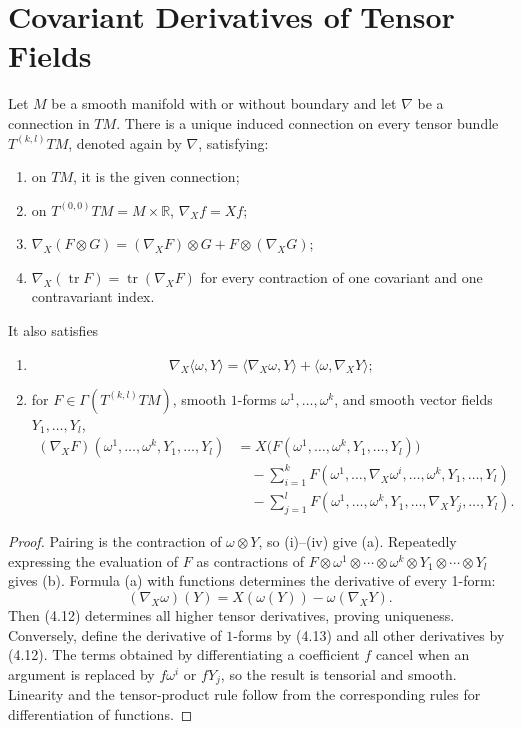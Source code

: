 \section{Covariant Derivatives of Tensor Fields}

\begin{proposition}
\label{prop:connection-on-tensor-bundles}


Let $M$ be a smooth manifold with or without boundary and let $\nabla$ be a
connection in $TM$. There is a unique induced connection on every tensor
bundle $T^{(k,l)}TM$, denoted again by $\nabla$, satisfying:
\begin{enumerate}
\item[(i)] on $TM$, it is the given connection;
\item[(ii)] on $T^{(0,0)}TM=M\times\mathbb R$, $\nabla_Xf=Xf$;
\item[(iii)] $\nabla_X(F\otimes G)=(\nabla_XF)\otimes G+F\otimes(\nabla_XG)$;
\item[(iv)] $\nabla_X(\operatorname{tr}F)=\operatorname{tr}(\nabla_XF)$ for every
contraction of one covariant and one contravariant index.
\end{enumerate}
It also satisfies
\begin{enumerate}
\item[(a)]
\[
\nabla_X\langle\omega,Y\rangle
=\langle\nabla_X\omega,Y\rangle+\langle\omega,\nabla_XY\rangle;
\]
\item[(b)] for $F\in\Gamma(T^{(k,l)}TM)$, smooth $1$-forms
$\omega^1,\ldots,\omega^k$, and smooth vector fields $Y_1,\ldots,Y_l$,
\begin{align}
(\nabla_XF)(\omega^1,\ldots,\omega^k,Y_1,\ldots,Y_l)
&=X\big(F(\omega^1,\ldots,\omega^k,Y_1,\ldots,Y_l)\big)\nonumber\\
&\quad-\sum_{i=1}^kF(\omega^1,\ldots,\nabla_X\omega^i,\ldots,\omega^k,Y_1,\ldots,Y_l)\nonumber\\
&\quad-\sum_{j=1}^lF(\omega^1,\ldots,\omega^k,Y_1,\ldots,\nabla_XY_j,\ldots,Y_l).
\label{eq:4.12}\tag{4.12}
\end{align}
\end{enumerate}
\end{proposition}
\begin{proof}
\sketch Pairing is the contraction of $\omega\otimes Y$, so (i)--(iv) give
(a). Repeatedly expressing the evaluation of $F$ as contractions of
$F\otimes\omega^1\otimes\cdots\otimes\omega^k\otimes Y_1\otimes\cdots\otimes
Y_l$ gives (b). Formula (a) with functions determines the derivative of every
1-form:
\begin{equation}
(\nabla_X\omega)(Y)=X(\omega(Y))-\omega(\nabla_XY).
\label{eq:4.13}\tag{4.13}
\end{equation}
Then (4.12) determines all higher tensor derivatives, proving uniqueness.
Conversely, define the derivative of $1$-forms by (4.13) and all other
derivatives by (4.12). The terms obtained by differentiating a coefficient
$f$ cancel when an argument is replaced by $f\omega^i$ or $fY_j$, so the
result is tensorial and smooth. Linearity and the tensor-product rule follow
from the corresponding rules for differentiation of functions.
\end{proof}

